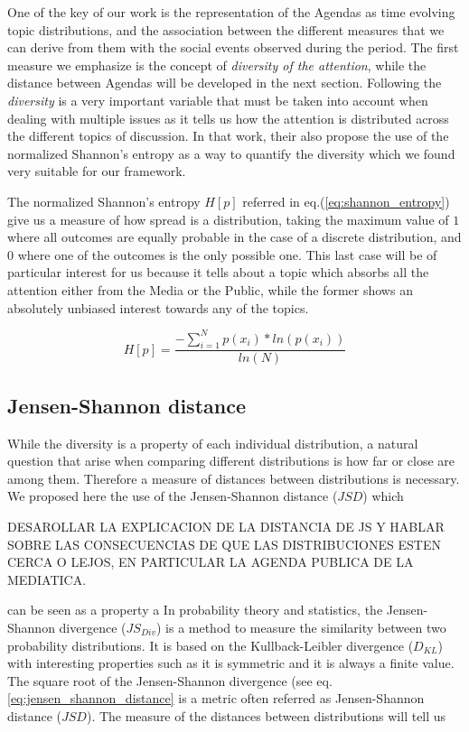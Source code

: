\documentclass{bmcart}
\begin{document}
\par One of the key of our work is the representation of the Agendas as time evolving topic distributions, and the association between the different measures that we can derive from them with the social events observed during the period.
The first measure we emphasize is the concept of \emph{diversity of the attention}, while the distance between Agendas will be developed in the next section.
Following \cite{boydstun2014importance} the \emph{diversity} is a very important variable that must be taken into account when dealing with multiple issues as it tells us how the attention is distributed across the different topics of discussion. In that work, their also propose the use of the normalized Shannon's entropy as a way to quantify the diversity which we found very suitable for our framework.
\par The normalized Shannon's entropy $H[p]$ referred in eq.(\ref{eq:shannon_entropy}) give us a measure of how spread is a distribution, taking the maximum value of $1$ where all outcomes are equally probable in the case of a discrete distribution, and $0$ where one of the outcomes is the only possible one. 
This last case will be of particular interest for us because it tells about a topic which absorbs all the attention either from the Media or the Public, while the former shows an absolutely unbiased interest towards any of the topics.

\begin{equation}
H[p] = \frac{- \sum_{i = 1}^{N} p(x_i) * ln(p(x_i))}{ln(N)}
\label{eq:shannon_entropy}
\end{equation}

\subsection*{Jensen-Shannon distance}

\par While the diversity is a property of each individual distribution, a natural question that arise when comparing different distributions is how far or close are among them.
Therefore a measure of distances between distributions is necessary. 
We proposed here the use of the Jensen-Shannon distance ($JSD$) which 

DESAROLLAR LA EXPLICACION DE LA DISTANCIA DE JS Y HABLAR SOBRE LAS CONSECUENCIAS DE QUE LAS DISTRIBUCIONES ESTEN CERCA O LEJOS, EN PARTICULAR LA AGENDA PUBLICA DE LA MEDIATICA.

can be seen as a property a In probability theory and statistics, the Jensen-Shannon divergence ($JS_{Div}$) is a method to measure the similarity between two probability distributions. It is based on the Kullback-Leibler divergence ($D_{KL}$) with interesting properties such as it is symmetric and it is always a finite value. The square root of the Jensen-Shannon divergence (see eq.\ref{eq:jensen_shannon_distance} is a metric \cite{fuglede2004jensen} often referred as Jensen-Shannon distance ($JSD$).
The measure of the distances between distributions will tell us  
\end{document}
